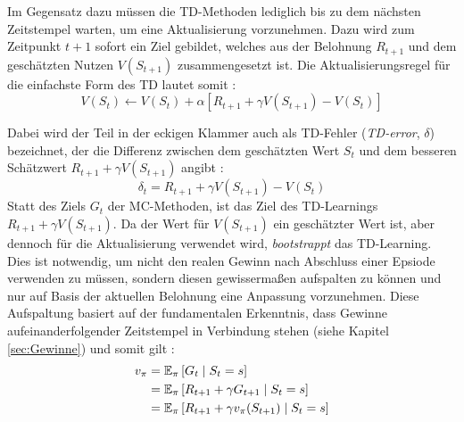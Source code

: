 Im Gegensatz dazu müssen die TD-Methoden lediglich bis zu dem nächsten Zeitstempel warten, um eine Aktualisierung vorzunehmen. Dazu wird zum Zeitpunkt $t+1$ sofort ein Ziel gebildet, welches aus der Belohnung $R_{t+1}$ und dem geschätzten Nutzen $V(S_{t+1})$ zusammengesetzt ist. Die Aktualisierungsregel für die einfachste Form des TD lautet somit \cite[S.~120]{Sutton1998}:
\begin{equation}\label{eq:tdupdate}
    V(S_t) \gets V(S_t) + \alpha \left[R_{t+1} + \gamma V(S_{t+1}) - V(S_t)\right]
\end{equation}
\par 
Dabei wird der Teil in der eckigen Klammer auch als TD-Fehler (\textit{TD-error}, $\delta$) bezeichnet, der die Differenz zwischen dem geschätzten Wert $S_t$ und dem besseren Schätzwert $R_{t+1} + \gamma V(S_{t+1})$ angibt \cite[S.~121]{Sutton1998}:
\begin{equation}\label{eq:tderror}
    \delta_t = R_{t+1} + \gamma V(S_{t+1}) - V(S_t)
\end{equation}
Statt des Ziels $G_t$ der MC-Methoden, ist das Ziel des TD-Learnings $R_{t+1} + \gamma V(S_{t+1})$. Da der Wert für $V(S_{t+1})$ ein geschätzter Wert ist, aber dennoch für die Aktualisierung verwendet wird, \textit{bootstrappt} das TD-Learning. Dies ist notwendig, um nicht den realen Gewinn nach Abschluss einer Epsiode verwenden zu müssen, sondern diesen gewissermaßen aufspalten zu können und nur auf Basis der aktuellen Belohnung eine Anpassung vorzunehmen. Diese Aufspaltung basiert auf der fundamentalen Erkenntnis, dass Gewinne aufeinanderfolgender Zeitstempel in Verbindung stehen (siehe Kapitel \ref{sec:Gewinne}) und somit gilt \cite[S.~120]{Sutton1998}: 
\begin{equation}\label{eq:targets}
\begin{aligned}
v_\pi &= \operatorname{\mathbb{E}}_\pi\left[G_t \mid S_t = s \right] \\
&= \operatorname{\mathbb{E}}_\pi\left[R_{t+1} + \gamma G_{t+1} \mid S_t = s \right] \\
        &= \operatorname{\mathbb{E}}_\pi\left[R_{t+1} + \gamma v_\pi(S_{t+1}) \mid S_t = s \right]
\end{aligned}
\end{equation}

